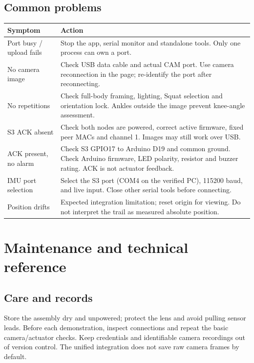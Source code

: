 \documentclass[11pt,a4paper]{article}
\newcommand{\page}[1]{\clearpage\section{#1}}
\begin{document}
\subsection{Common problems}
\par\begin{tabularx}{\linewidth}{@{}p{35mm} X@{}}\toprule
Symptom & Action\\\midrule
Port busy / upload fails & Stop the app, serial monitor and standalone tools. Only one process can own a port.\\
No camera image & Check USB data cable and actual CAM port. Use camera reconnection in the page; re-identify the port after reconnecting.\\
No repetitions & Check full-body framing, lighting, Squat selection and orientation lock. Ankles outside the image prevent knee-angle assessment.\\
S3 ACK absent & Check both nodes are powered, correct active firmware, fixed peer MACs and channel 1. Images may still work over USB.\\
ACK present, no alarm & Check S3 GPIO17 to Arduino D19 and common ground. Check Arduino firmware, LED polarity, resistor and buzzer rating. ACK is not actuator feedback.\\
IMU port selection & Select the S3 port (COM4 on the verified PC), 115200 baud, and live input. Close other serial tools before connecting.\\
Position drifts & Expected integration limitation; reset origin for viewing. Do not interpret the trail as measured absolute position.\\\bottomrule
\end{tabularx}
\page{Maintenance and technical reference}
\subsection{Care and records}
Store the assembly dry and unpowered; protect the lens and avoid pulling sensor leads. Before each demonstration, inspect connections and repeat the basic camera/actuator checks. Keep credentials and identifiable camera recordings out of version control. The unified integration does not save raw camera frames by default.
\end{document}
